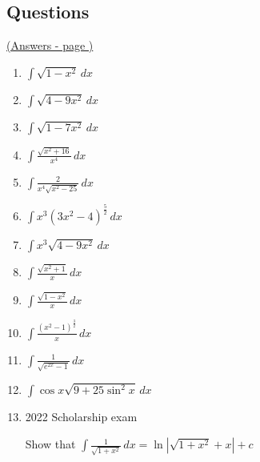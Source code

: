 \documentclass[../main.tex]{subfiles}
\begin{document}
    
\pagebreak
\hypertarget{trigsubslink}{\subsection*{Questions}}
\hyperlink{trigsubsanswers}{(Answers - page {\pageref*{Trig subs answers}})}

\label{Trig substitution}
\begin{enumerate}[itemsep=0.7cm]
    \item 
    \(\int \sqrt{1-x^2}\,dx\)

    \item 
    \(\int \sqrt{4-9x^2}\,dx\)

    \item 
    \(\int \sqrt{1-7x^2}\,dx\)

    \item 
    \(\int \frac{\sqrt{x^2+16}}{x^4}\,dx\)

    \item 
    \(\int \frac{2}{x^4\sqrt{x^2-25}}\,dx\)

    \item 
    \(\int x^3(3x^2-4)^{\frac{5}{2}}\,dx\)

    \item 
    \(\int x^3\sqrt{4-9x^2}\,dx\)

    \item 
    \(\int \frac{\sqrt{x^2+1}}{x}\,dx\)

    \item 
    \(\int \frac{\sqrt{1-x^2}}{x}\,dx\)

    \item 
    \(\int \frac{(x^2-1)^{\frac{3}{2}}}{x}\,dx\)

    \item
    $\int \frac{1}{\sqrt{e^{2x}-1}}\,dx$

    \item 
    \(\int \cos{x}\sqrt{9+25\sin^2{x}}\,dx\)

    \item 2022 Scholarship exam
    
    Show that \(\int \frac{1}{\sqrt{1+x^2}}\,dx=\ln{|\sqrt{1+x^2}+x|}+c\)
    
\end{enumerate}


\pagebreak
\end{document}
